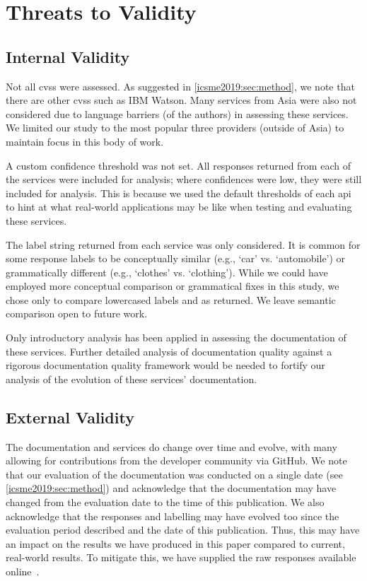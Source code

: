 \section{Threats to Validity}
\label{icsme2019:sec:limitations}

\subsection{Internal Validity}
Not all \glspl{cvs} were assessed. As suggested in \cref{icsme2019:sec:method}, we note that there are other \glspl{cvs} such as IBM Watson. Many services from Asia were also not considered due to language barriers (of the authors) in assessing these services. We limited our study to the most popular three providers (outside of Asia) to maintain focus in this body of work.
 
A custom confidence threshold was not set. All responses returned from each of the services were included for analysis; where confidences were low, they were still included for analysis. This is because we used the default thresholds of each \gls{api} to hint at what real-world applications may be like when testing and evaluating these services.

The label string returned from each service was only considered. It is common for some response labels to be conceptually similar (e.g., `car' vs. `automobile') or grammatically different (e.g., `clothes' vs. `clothing'). While we could have employed more conceptual comparison or grammatical fixes in this study, we chose only to compare lowercased labels and as returned. We leave semantic comparison open to future work.

Only introductory analysis has been applied in assessing the documentation of these services. Further detailed analysis of documentation quality against a rigorous documentation quality framework would be needed to fortify our analysis of the evolution of these services' documentation.

\subsection{External Validity}

The documentation and services do change over time and evolve, with many allowing for contributions from the developer community via GitHub. We note that our evaluation of the documentation was conducted on a single date (see \cref{icsme2019:sec:method}) and acknowledge that the documentation may have changed from the evaluation date to the time of this publication. We also acknowledge that the responses and labelling may have evolved too since the evaluation period described and the date of this publication. Thus, this may have an impact on the results we have produced in this paper compared to current, real-world results. To mitigate this, we have supplied the raw responses available online~.

